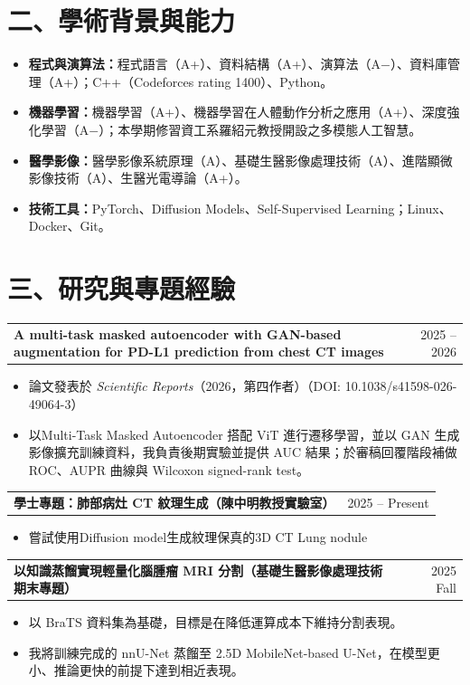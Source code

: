 \documentclass[11pt]{article}
\makeatletter
\newcommand{\entry}[2]{%
  \par\noindent
  \begin{tabularx}{\textwidth}{@{}X r@{}}
    \textbf{#1} & #2
  \end{tabularx}\par}
\makeatother
\begin{document}
\section*{二、學術背景與能力}
\begin{itemize}
  \item \textbf{程式與演算法：}程式語言（A+）、資料結構（A+）、演算法（A$-$）、資料庫管理（A+）；C++（Codeforces rating 1400）、Python。
  \item \textbf{機器學習：}機器學習（A+）、機器學習在人體動作分析之應用（A+）、深度強化學習（A$-$）；本學期修習資工系羅紹元教授開設之多模態人工智慧。
  \item \textbf{醫學影像：}醫學影像系統原理（A）、基礎生醫影像處理技術（A）、進階顯微影像技術（A）、生醫光電導論（A+）。
  \item \textbf{技術工具：}PyTorch、Diffusion Models、Self-Supervised Learning；Linux、Docker、Git。
\end{itemize}

\section*{三、研究與專題經驗}

\entry{A multi-task masked autoencoder with GAN-based augmentation for PD-L1 prediction from chest CT images}{2025 -- 2026}
\begin{itemize}
  \item 論文發表於 \textit{Scientific Reports}（2026，第四作者）（DOI: 10.1038/s41598-026-49064-3）
  \item 以Multi-Task Masked Autoencoder 搭配 ViT 進行遷移學習，並以 GAN 生成影像擴充訓練資料，我負責後期實驗並提供 AUC 結果；於審稿回覆階段補做 ROC、AUPR 曲線與 Wilcoxon signed-rank test。
\end{itemize}

\entry{學士專題：肺部病灶 CT 紋理生成（陳中明教授實驗室）}{2025 -- Present}
\begin{itemize}
  \item 嘗試使用Diffusion model生成紋理保真的3D CT Lung nodule
\end{itemize}

\entry{以知識蒸餾實現輕量化腦腫瘤 MRI 分割（基礎生醫影像處理技術 期末專題）}{2025 Fall}
\begin{itemize}
  \item 以 BraTS 資料集為基礎，目標是在降低運算成本下維持分割表現。
  \item 我將訓練完成的 nnU-Net 蒸餾至 2.5D MobileNet-based U-Net，在模型更小、推論更快的前提下達到相近表現。
\end{itemize}
\end{document}
